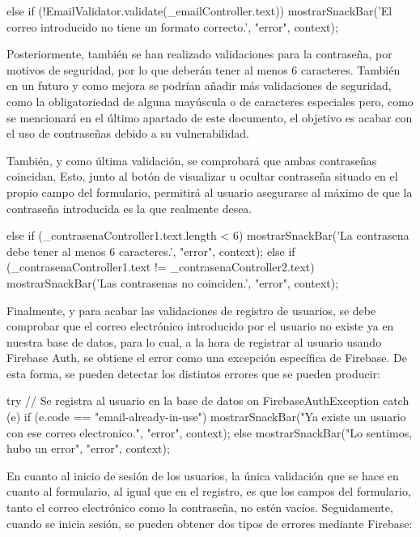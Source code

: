 \documentclass{article}
\begin{document}
\vspace{0.5cm}
\begin{codigo}
else if (!EmailValidator.validate(_emailController.text))
{
    mostrarSnackBar('El correo introducido no tiene un formato correcto.',
    "error", context);
}
\end{codigo}

Posteriormente, también se han realizado validaciones para la contraseña, por motivos de seguridad, por lo que deberán tener al menos 6 caracteres. También en un futuro y como mejora se podrían añadir más validaciones de seguridad, como la obligatoriedad de alguna mayúscula o de caracteres especiales pero, como se mencionará en el último apartado de este documento, el objetivo es acabar con el uso de contraseñas debido a su vulnerabilidad.

También, y como última validación, se comprobará que ambas contraseñas coincidan. Esto, junto al botón de visualizar u ocultar contraseña situado en el propio campo del formulario, permitirá al usuario asegurarse al máximo de que la contraseña introducida es la que realmente desea.

\begin{codigo}
else if (_contrasenaController1.text.length < 6)
{
    mostrarSnackBar('La contrasena debe tener al menos 6 caracteres.',
    "error", context);
}
else if (_contrasenaController1.text != _contrasenaController2.text)
{
    mostrarSnackBar('Las contrasenas no coinciden.', "error", context);
}
\end{codigo}

Finalmente, y para acabar las validaciones de registro de usuarios, se debe comprobar que el correo electrónico introducido por el usuario no existe ya en nuestra base de datos, para lo cual, a la hora de registrar al usuario usando Firebase Auth, se obtiene el error como una excepción específica de Firebase. De esta forma, se pueden detectar los distintos errores que se pueden producir:

\vspace{0.5cm}
\begin{codigo}
try {
    // Se registra al usuario en la base de datos
} on FirebaseAuthException catch (e)
{
    if (e.code == "email-already-in-use")
    {
        mostrarSnackBar("Ya existe un usuario con ese correo electronico.",
        "error", context);
    } else
    {
        mostrarSnackBar("Lo sentimos, hubo un error", "error", context);
    }
}
\end{codigo}

En cuanto al inicio de sesión de los usuarios, la única validación que se hace en cuanto al formulario, al igual que en el registro, es que los campos del formulario, tanto el correo electrónico como la contraseña, no estén vacíos. Seguidamente, cuando se inicia sesión, se pueden obtener dos tipos de errores mediante Firebase:
\end{document}

